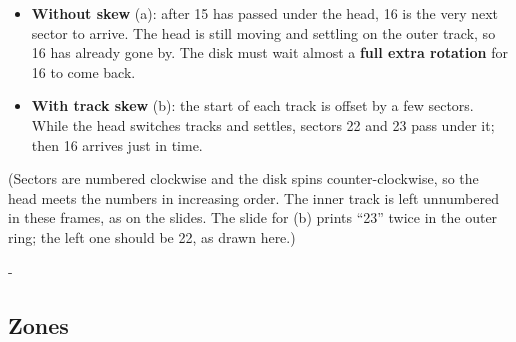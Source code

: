 \documentclass[11pt,a4paper]{article}
\makeatletter
\newcommand{\keepspace}[1]{\par\penalty-100\begingroup
  \setlength{\dimen@}{#1}\dimen@ii\pagegoal\advance\dimen@ii-\pagetotal
  \ifdim\dimen@>\dimen@ii\ifdim\dimen@ii>\z@\vfil\fi\break\fi\endgroup}
\makeatother
\begin{document}
\begin{itemize}
  \item \textbf{Without skew} (a): after 15 has passed under the head, 16 is
        the very next sector to arrive. The head is still moving and settling
        on the outer track, so 16 has already gone by. The disk must wait
        almost a \textbf{full extra rotation} for 16 to come back.
  \item \textbf{With track skew} (b): the start of each track is offset by a
        few sectors. While the head switches tracks and settles, sectors 22
        and 23 pass under it; then 16 arrives just in time.
\end{itemize}
{\small (Sectors are numbered clockwise and the disk spins
counter-clockwise, so the head meets the numbers in increasing order. The
inner track is left unnumbered in these frames, as on the slides. The slide
for (b) prints ``23'' twice in the outer ring; the left one should be 22, as
drawn here.)}

\keepspace{22\baselineskip}
\subsection{Zones}
\end{document}
